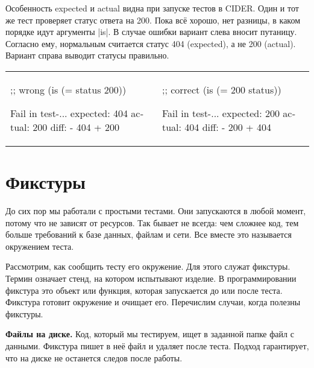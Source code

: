 
Особенность expected и actual видна при запуске тестов в CIDER. Один и тот же
тест проверяет статус ответа на 200. Пока вс\"{е} хорошо, нет разницы, в каком
порядке идут аргументы \spverb|is|. В случае ошибки вариант слева вносит
путаницу. Согласно ему, нормальным считается статус 404 (expected), а не 200
(actual). Вариант справа выводит статусы правильно.

\noindent
\begin{tabular}{ @{}p{5cm} @{}p{5cm} }

\begin{english}
  \begin{clojure}
;; wrong
(is (= status 200))

Fail in test-...
expected: 404
  actual: 200
    diff: - 404
          + 200
  \end{clojure}
\end{english}

&

\begin{english}
  \begin{clojure}
;; correct
(is (= 200 status))

Fail in test-...
expected: 200
  actual: 404
    diff: - 200
          + 404
  \end{clojure}
\end{english}

\end{tabular}

\section{Фикстуры}


До сих пор мы работали с простыми тестами. Они запускаются в любой момент,
потому что не зависят от ресурсов. Так бывает не всегда: чем сложнее код, тем
больше требований к базе данных, файлам и сети. Все вместе это называется
окружением теста.

Рассмотрим, как сообщить тесту его окружение. Для этого служат фикстуры. Термин
означает стенд, на котором испытывают изделие. В программировании фикстура это
объект или функция, которая запускается до или после теста. Фикстура готовит
окружение и очищает его. Перечислим случаи, когда полезны фикстуры.


\textbf{Файлы на диске.} Код, который мы тестируем, ищет в заданной папке файл с
данными. Фикстура пишет в не\"{е} файл и удаляет после теста. Подход гарантирует,
что на диске не останется следов после работы.

